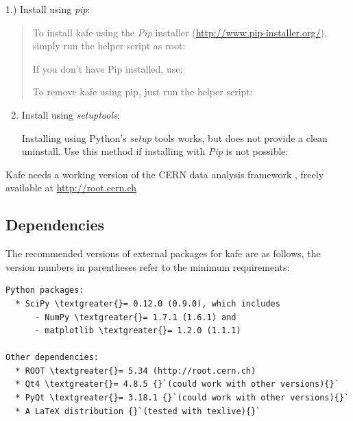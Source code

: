 \documentclass[a4paper,10pt,english]{sphinxmanual}
\begin{document}
1.) Install using \emph{pip}:
\begin{quote}

To install kafe using the \emph{Pip} installer
(\href{http://www.pip-installer.org/}{http://www.pip-installer.org/}), simply
run the helper script as root:
\begin{quote}

\end{quote}

If you don't have Pip installed, use:
\begin{quote}

\end{quote}

To remove kafe using pip, just run the helper script:
\begin{quote}

\end{quote}
\end{quote}
\begin{enumerate}
\setcounter{enumi}{1}
\item {} 
Install using \emph{setuptools}:

Installing using Python's \emph{setup} tools works, but does not
provide a clean uninstall. Use this method if installing
with \emph{Pip} is not possible:
\begin{quote}

\end{quote}

\end{enumerate}

Kafe needs a working version of the CERN data analysis framework ,
freely available at  \href{http://root.cern.ch}{http://root.cern.ch}


\subsection{Dependencies}
\label{index:dependencies}
The recommended versions of external packages for kafe are as follows,
the version numbers in parentheses refer to the minimum requirements:

\begin{Verbatim}[commandchars=\\\{\}]
Python packages:
  * SciPy \textgreater{}= 0.12.0 (0.9.0), which includes
      - NumPy \textgreater{}= 1.7.1 (1.6.1) and
      - matplotlib \textgreater{}= 1.2.0 (1.1.1)

Other dependencies:
  * ROOT \textgreater{}= 5.34 (http://root.cern.ch)
  * Qt4 \textgreater{}= 4.8.5 {}`(could work with other versions){}`
  * PyQt \textgreater{}= 3.18.1 {}`(could work with other versions){}`
  * A LaTeX distribution {}`(tested with texlive){}`
\end{Verbatim}
\end{document}
